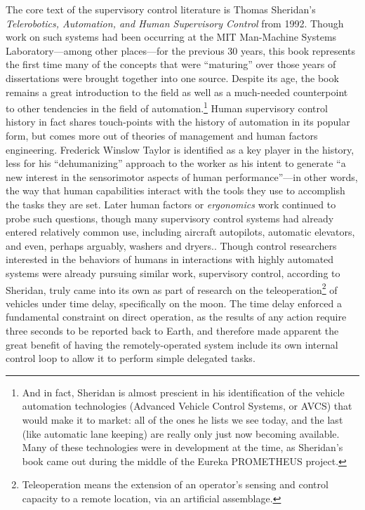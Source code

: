 The core text of the supervisory control literature is Thomas
Sheridan's \emph{Telerobotics, Automation, and Human Supervisory
  Control} from 1992. Though work on such systems had been occurring
at the MIT Man-Machine Systems Laboratory---among other places---for
the previous 30 years, this book represents the first time many of the
concepts that were ``maturing'' over those years of dissertations were
brought together into one source.\cite[p. xix]{sheridan} Despite its
age, the book remains a great introduction to the field as well as a
much-needed counterpoint to other tendencies in the field of
automation.\footnote{And in fact, Sheridan is almost prescient in his
  identification of the vehicle automation technologies (Advanced
  Vehicle Control Systems, or AVCS) that would
  make it to market: all of the ones he lists we see today, and the
  last (like automatic lane keeping) are really only just now becoming
  available. Many of these technologies were in development at the
  time, as Sheridan's book came out during the middle of the Eureka
  PROMETHEUS project.} Human supervisory control history in fact
shares touch-points with the history of automation in its popular
form, but comes more out of theories of management and human factors
engineering. Frederick Winslow Taylor is identified as a key player in
the history, less for his ``dehumanizing'' approach to the worker as
his intent to generate ``a new interest in the sensorimotor aspects of
human performance''---in other words, the way that human capabilities
interact with the tools they use to accomplish the tasks they are
set\cite[p. 7]{sheridan}. Later human factors or \emph{ergonomics}
work continued to probe such questions, though many supervisory
control systems had already entered relatively common use, including
aircraft autopilots, automatic elevators, and even, perhaps arguably,
washers and dryers.\cite[p. 8]{sheridan}. Though control researchers
interested in the behaviors of humans in interactions with highly
automated systems were already pursuing similar work, supervisory
control, according to Sheridan, truly came into its own as part of
research on the teleoperation\footnote{Teleoperation means the
  extension of an operator's sensing and control capacity to a remote
  location, via an artificial assemblage.\cite[p. 4]{sheridan}} of vehicles under time delay,
specifically on the moon. The time delay enforced a fundamental
constraint on direct operation, as the results of any action require
three seconds to be reported back to Earth, and therefore made
apparent the great benefit of having the remotely-operated system
include its own internal control loop to allow it to perform simple
delegated tasks.\cite[p. 9]{sheridan}

